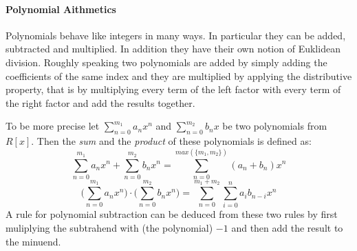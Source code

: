 \paragraph{Polynomial Aithmetics}
Polynomials behave like integers in many ways. In particular they can be added, subtracted and multiplied. In addition they have their own notion of Euklidean division. Roughly speaking two polynomials are added by simply adding the coefficients of the same index and they are multiplied by applying the distributive property, that is by multiplying every term of the left factor with every term of the right factor and add the results together.

To be more precise let $ \sum _{n = 0} ^{m_1}{a} _{n}{x} ^{n} $ and
$ \sum _{n = 0} ^{m_2}{b} _{n}{x} $ be two polynomials from $ R[x]$. Then the \textit{sum} and the \textit{product} of these polynomials is defined as:
\begin{equation}
\sum _{n = 0} ^{m_1}{a} _{n}{x} ^{n} + \sum _{n = 0} ^{m_2}{b} _{n}{x } ^{n} = \sum _{n = 0} ^{max(\{m_1,m_2\})}{({a} _{n} +{b} _{n})}{x} ^{n}
\end{equation}
\begin{equation}
\bigg (\sum _{n = 0} ^{m_1}{a} _{n}{x} ^{n} \bigg) \cdot \bigg (\sum _{n = 0} ^{m_2 }{b} _{n}{x} ^{n} \bigg) = \sum _{n = 0} ^{m_1+m_2} \sum _{i = 0} ^{n}{a} _{i }{{b} _{n-i}}{x} ^{n}
\end{equation}
A rule for polynomial subtraction can be deduced from these two rules by first muliplying the subtrahend with (the polynomial) $-1$ and then add the result to the minuend.

